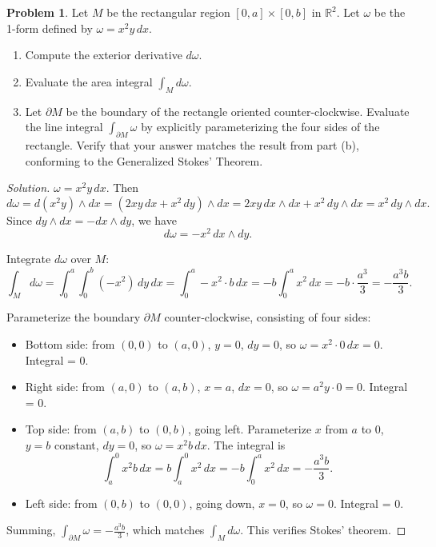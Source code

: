 \documentclass[12pt, a4paper]{article}
\theoremstyle{definition}
\newtheorem{problem}{Problem}
\newenvironment{solution}
  {\renewcommand\qedsymbol{$\blacksquare$}\begin{proof}[Solution]}
  {\end{proof}}
\begin{document}
\begin{problem}
Let $M$ be the rectangular region $[0,a] \times [0,b]$ in $\mathbb{R}^2$. Let $\omega$ be the 1-form defined by $\omega = x^2 y \, dx$.
\begin{enumerate}
    \item[(a)] Compute the exterior derivative $d\omega$.
    \item[(b)] Evaluate the area integral $\int_M d\omega$.
    \item[(c)] Let $\partial M$ be the boundary of the rectangle oriented counter-clockwise. Evaluate the line integral $\int_{\partial M} \omega$ by explicitly parameterizing the four sides of the rectangle. Verify that your answer matches the result from part (b), conforming to the Generalized Stokes' Theorem.
\end{enumerate}
\end{problem}

\begin{solution}\item[(a)] \( \omega = x^2 y \, dx \). Then
    \[
    d\omega = d(x^2 y) \wedge dx = (2xy\,dx + x^2\,dy) \wedge dx = 2xy\,dx\wedge dx + x^2\,dy\wedge dx = x^2\,dy\wedge dx.
    \]
    Since \(dy\wedge dx = -dx\wedge dy\), we have
    \[
    d\omega = -x^2 \, dx\wedge dy.
    \]

    \item[(b)] Integrate \(d\omega\) over \(M\):
    \[
    \int_M d\omega = \int_0^a \int_0^b (-x^2) \, dy \, dx = \int_0^a -x^2 \cdot b \, dx = -b \int_0^a x^2\,dx = -b \cdot \frac{a^3}{3} = -\frac{a^3 b}{3}.
    \]

    \item[(c)] Parameterize the boundary \(\partial M\) counter‑clockwise, consisting of four sides:
    \begin{itemize}
        \item Bottom side: from \((0,0)\) to \((a,0)\), \(y=0\), \(dy=0\), so \(\omega = x^2\cdot 0\,dx = 0\). Integral = \(0\).
        \item Right side: from \((a,0)\) to \((a,b)\), \(x=a\), \(dx=0\), so \(\omega = a^2 y \cdot 0 = 0\). Integral = \(0\).
        \item Top side: from \((a,b)\) to \((0,b)\), going left. Parameterize \(x\) from \(a\) to \(0\), \(y=b\) constant, \(dy=0\), so \(\omega = x^2 b\,dx\). The integral is
        \[
        \int_{a}^{0} x^2 b\,dx = b \int_{a}^{0} x^2\,dx = -b \int_0^a x^2\,dx = -\frac{a^3 b}{3}.
        \]
        \item Left side: from \((0,b)\) to \((0,0)\), going down, \(x=0\), so \(\omega = 0\). Integral = \(0\).
    \end{itemize}
    Summing, \(\int_{\partial M} \omega = -\frac{a^3 b}{3}\), which matches \(\int_M d\omega\). This verifies Stokes' theorem.
\end{solution}

\vfill
\end{document}
